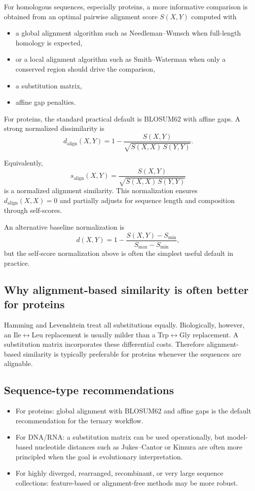 \documentclass[11pt,a4paper]{article}
\begin{document}
For homologous sequences, especially proteins, a more informative comparison is obtained from an optimal pairwise alignment score $S(X,Y)$ computed with

\begin{itemize}[leftmargin=*]
\item a global alignment algorithm such as Needleman--Wunsch when full-length homology is expected,
\item or a local alignment algorithm such as Smith--Waterman when only a conserved region should drive the comparison,
\item a substitution matrix,
\item affine gap penalties.
\end{itemize}

For proteins, the standard practical default is BLOSUM62 with affine gaps. A strong normalized dissimilarity is
\[
d_{\mathrm{align}}(X,Y)=1-\frac{S(X,Y)}{\sqrt{S(X,X)\,S(Y,Y)}}.
\]

Equivalently,
\[
s_{\mathrm{align}}(X,Y)=\frac{S(X,Y)}{\sqrt{S(X,X)\,S(Y,Y)}}
\]
is a normalized alignment similarity. This normalization ensures $d_{\mathrm{align}}(X,X)=0$ and partially adjusts for sequence length and composition through self-scores.

An alternative baseline normalization is
\[
d(X,Y)=1-\frac{S(X,Y)-S_{\min}}{S_{\max}-S_{\min}},
\]
but the self-score normalization above is often the simplest useful default in practice.

\subsection{Why alignment-based similarity is often better for proteins}

Hamming and Levenshtein treat all substitutions equally. Biologically, however, an Ile$\leftrightarrow$Leu replacement is usually milder than a Trp$\leftrightarrow$Gly replacement. A substitution matrix incorporates these differential costs. Therefore alignment-based similarity is typically preferable for proteins whenever the sequences are alignable.

\subsection{Sequence-type recommendations}

\begin{itemize}[leftmargin=*]
\item For proteins: global alignment with BLOSUM62 and affine gaps is the default recommendation for the ternary workflow.
\item For DNA/RNA: a substitution matrix can be used operationally, but model-based nucleotide distances such as Jukes--Cantor or Kimura are often more principled when the goal is evolutionary interpretation.
\item For highly diverged, rearranged, recombinant, or very large sequence collections: feature-based or alignment-free methods may be more robust.
\end{itemize}
\end{document}
